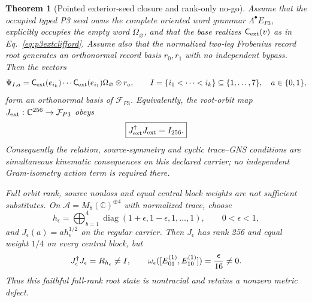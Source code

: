\documentclass[11pt]{article}
\newtheorem{theorem}{Theorem}
\begin{document}
\begin{theorem}[Pointed exterior-seed closure and rank-only no-go]
\label{thm:p3exteriorseedclosure}
Assume that the occupied typed P3 seed owns the complete oriented word
grammar $\Lambda^\bullet E_{P3}$, explicitly occupies the empty word
$\Omega_\varnothing$, and that the base realizes
$\mathsf C_{\rm ext}(v)$ as in Eq.~\eqref{eq:p3extclifford}.  Assume also that
the normalized two-leg Frobenius record root generates an orthonormal record
basis $r_0,r_1$ with no independent bypass.  Then the vectors
\begin{equation}
 \Psi_{I,a}
 =\mathsf C_{\rm ext}(e_{i_k})\cdots
  \mathsf C_{\rm ext}(e_{i_1})\Omega_\varnothing\otimes r_a,
 \qquad I=\{i_1<\cdots<i_k\}\subseteq\{1,\ldots,7\},
 \quad a\in\{0,1\},
 \label{eq:p3pointedorbit}
\end{equation}
form an orthonormal basis of $\mathcal F_{P3}$.  Equivalently, the root-orbit
map $J_{\rm ext}:\mathbb C^{256}\to\mathcal F_{P3}$ obeys
\begin{equation}
 \boxed{J_{\rm ext}^{\dagger}J_{\rm ext}=I_{256}.}
 \label{eq:p3exteriorgramlock}
\end{equation}
Consequently the relation, source-symmetry and cyclic trace--GNS conditions
are simultaneous kinematic consequences on this declared carrier; no
independent Gram-isometry action term is required there.

Full orbit rank, source nonloss and equal central block weights are not
sufficient substitutes.  On
$\mathcal A=M_8(\mathbb C)^{\oplus4}$ with normalized trace, choose
\begin{equation}
 h_\epsilon
 =\bigoplus_{b=1}^{4}
  \operatorname{diag}(1+\epsilon,1-\epsilon,1,\ldots,1),
 \qquad 0<\epsilon<1,
 \label{eq:p3nontracialdensity}
\end{equation}
and $J_\epsilon(a)=a h_\epsilon^{1/2}$ on the regular carrier.  Then
$J_\epsilon$ has rank 256 and equal weight $1/4$ on every central block, but
\begin{equation}
 J_\epsilon^\dagger J_\epsilon=R_{h_\epsilon}\ne I,
 \qquad
 \omega_\epsilon([E_{01}^{(1)},E_{10}^{(1)}])={\epsilon\over16}\ne0.
 \label{eq:p3rankonlycontrol}
\end{equation}
Thus this faithful full-rank root state is nontracial and retains a nonzero
metric defect.
\end{theorem}
\end{document}
